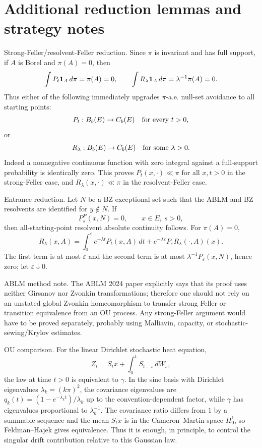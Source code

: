 \documentclass[12pt]{article}
\begin{document}
\section*{Additional reduction lemmas and strategy notes}

Strong-Feller/resolvent-Feller reduction.  Since $\pi$ is invariant and
has full support, if $A$ is Borel and $\pi(A)=0$, then
\[
  \int P_t{\bf1}_A\,d\pi=\pi(A)=0,\qquad
  \int R_\lambda{\bf1}_A\,d\pi=\lambda^{-1}\pi(A)=0.
\]
Thus either of the following immediately upgrades $\pi$-a.e. null-set
avoidance to all starting points:
\[
  P_t:B_b(E)\to C_b(E)\quad \hbox{for every }t>0,
\]
or
\[
  R_\lambda:B_b(E)\to C_b(E)\quad \hbox{for some }\lambda>0.
\]
Indeed a nonnegative continuous function with zero integral against a
full-support probability is identically zero.  This proves
$P_t(x,\cdot)\ll\pi$ for all $x,t>0$ in the strong-Feller case, and
$R_\lambda(x,\cdot)\ll\pi$ in the resolvent-Feller case.

Entrance reduction.  Let $N$ be a BZ exceptional set such that the ABLM
and BZ resolvents are identified for $y\notin N$.  If
\[
  P_s^P(x,N)=0,\qquad x\in E,\ s>0,
\]
then all-starting-point resolvent absolute continuity follows.  For
$\pi(A)=0$,
\[
 R_\lambda(x,A)
 =\int_0^\varepsilon e^{-\lambda t}P_t(x,A)\,dt
  +e^{-\lambda\varepsilon}P_\varepsilon R_\lambda(\cdot,A)(x).
\]
The first term is at most $\varepsilon$ and the second term is at most
$\lambda^{-1}P_\varepsilon(x,N)$, hence zero; let
$\varepsilon\downarrow0$.

ABLM method note.  The ABLM 2024 paper explicitly says that its proof
uses neither Girsanov nor Zvonkin transformations; therefore one should
not rely on an unstated global Zvonkin homeomorphism to transfer strong
Feller or transition equivalence from an OU process.  Any strong-Feller
argument would have to be proved separately, probably using Malliavin,
capacity, or stochastic-sewing/Krylov estimates.

OU comparison.  For the linear Dirichlet stochastic heat equation,
\[
  Z_t=S_t x+\int_0^t S_{t-s}\,dW_s,
\]
the law at time $t>0$ is equivalent to $\gamma$.  In the sine basis with
Dirichlet eigenvalues $\lambda_k=(k\pi)^2$, the covariance eigenvalues are
$q_k(t)=(1-e^{-\lambda_k t})/\lambda_k$ up to the convention-dependent
factor, while $\gamma$ has eigenvalues proportional to $\lambda_k^{-1}$.
The covariance ratio differs from $1$ by a summable sequence and the mean
$S_t x$ is in the Cameron--Martin space $H^1_0$, so Feldman--Hajek gives
equivalence.  Thus it is enough, in principle, to control the singular
drift contribution relative to this Gaussian law.
\end{document}
